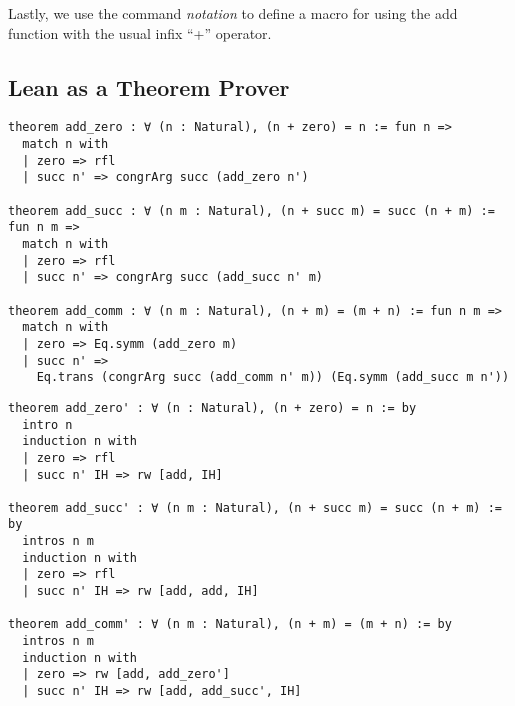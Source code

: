 Lastly, we use the command \textit{notation} to define a macro for using the add function with the usual infix ``+'' operator.

\subsection{Lean as a Theorem Prover}


\begin{verbatim}
theorem add_zero : ∀ (n : Natural), (n + zero) = n := fun n =>
  match n with
  | zero => rfl
  | succ n' => congrArg succ (add_zero n')

theorem add_succ : ∀ (n m : Natural), (n + succ m) = succ (n + m) := fun n m =>
  match n with
  | zero => rfl
  | succ n' => congrArg succ (add_succ n' m)

theorem add_comm : ∀ (n m : Natural), (n + m) = (m + n) := fun n m =>
  match n with
  | zero => Eq.symm (add_zero m)
  | succ n' =>
    Eq.trans (congrArg succ (add_comm n' m)) (Eq.symm (add_succ m n'))
\end{verbatim}

\begin{verbatim}
theorem add_zero' : ∀ (n : Natural), (n + zero) = n := by
  intro n
  induction n with
  | zero => rfl
  | succ n' IH => rw [add, IH]

theorem add_succ' : ∀ (n m : Natural), (n + succ m) = succ (n + m) := by
  intros n m
  induction n with
  | zero => rfl
  | succ n' IH => rw [add, add, IH]

theorem add_comm' : ∀ (n m : Natural), (n + m) = (m + n) := by
  intros n m
  induction n with
  | zero => rw [add, add_zero']
  | succ n' IH => rw [add, add_succ', IH]
\end{verbatim}
